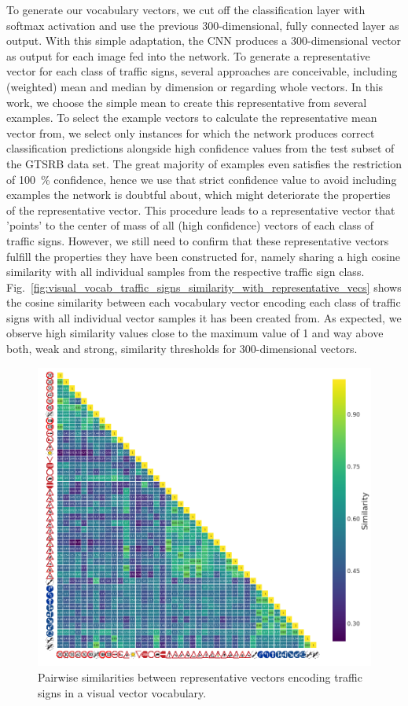 To generate our vocabulary vectors, we cut off the classification layer with softmax activation and use the previous \num{300}-dimensional, fully connected layer as output.
With this simple adaptation, the \ac{CNN} produces a \num{300}-dimensional vector as output for each image fed into the network. 
To generate a representative vector for each class of traffic signs, several approaches are conceivable, including (weighted) mean and median by dimension or regarding whole vectors.
In this work, we choose the simple mean to create this representative from several examples.
To select the example vectors to calculate the representative mean vector from, we select only instances for which the network produces correct classification predictions alongside high confidence values from the test subset of the \ac{GTSRB} data set.
The great majority of examples even satisfies the restriction of \SI{100}{\percent} confidence, hence we use that strict confidence value to avoid including examples the network is doubtful about, which might deteriorate the properties of the representative vector. 
This procedure leads to a representative vector that 'points' to the center of mass of all (high confidence) vectors of each class of traffic signs.
However, we still need to confirm that these representative vectors fulfill the properties they have been constructed for, namely sharing a high cosine similarity with all individual samples from the respective traffic sign class.
Fig.~\ref{fig:visual_vocab_traffic_signs_similarity_with_representative_vecs} shows the cosine similarity between each vocabulary vector encoding each class of traffic signs with all individual vector samples it has been created from.
As expected, we observe high similarity values close to the maximum value of \num{1} and way above both, weak and strong, similarity thresholds for \num{300}-dimensional vectors.

\begin{figure}[t]
    \centering
    \includegraphics[width=0.8\linewidth]{imgs/visual_vocab_traffic_signs_internal_similarities.png}
    \caption{Pairwise similarities between representative vectors encoding traffic signs in a visual vector vocabulary.}
    \label{fig:visual_vocab_traffic_signs_internal_similarities}
\end{figure}

